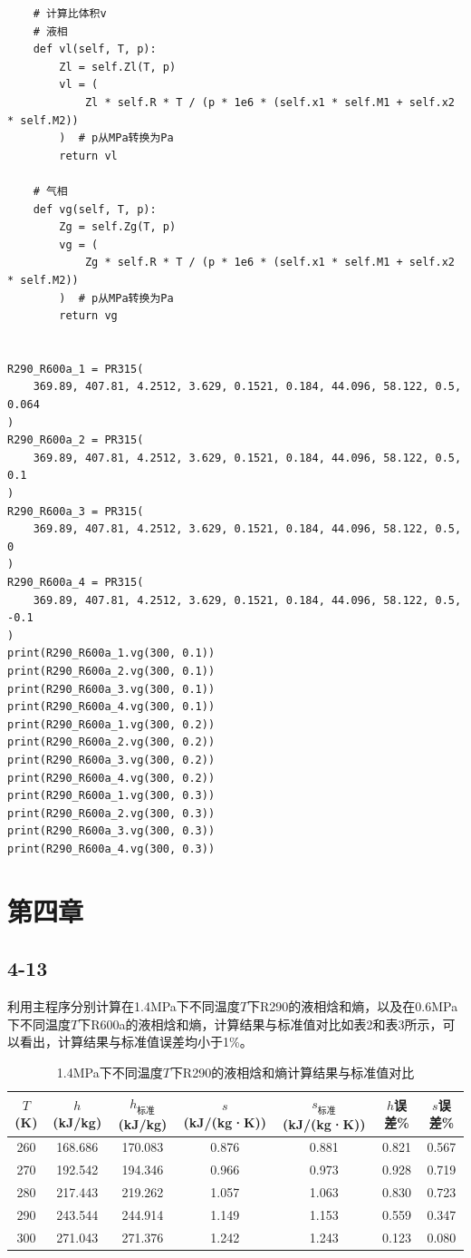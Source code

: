 \documentclass[12pt,a4paper]{article}
\begin{document}
\begin{lstlisting}
    # 计算比体积v
    # 液相
    def vl(self, T, p):
        Zl = self.Zl(T, p)
        vl = (
            Zl * self.R * T / (p * 1e6 * (self.x1 * self.M1 + self.x2 * self.M2))
        )  # p从MPa转换为Pa
        return vl

    # 气相
    def vg(self, T, p):
        Zg = self.Zg(T, p)
        vg = (
            Zg * self.R * T / (p * 1e6 * (self.x1 * self.M1 + self.x2 * self.M2))
        )  # p从MPa转换为Pa
        return vg


R290_R600a_1 = PR315(
    369.89, 407.81, 4.2512, 3.629, 0.1521, 0.184, 44.096, 58.122, 0.5, 0.064
)
R290_R600a_2 = PR315(
    369.89, 407.81, 4.2512, 3.629, 0.1521, 0.184, 44.096, 58.122, 0.5, 0.1
)
R290_R600a_3 = PR315(
    369.89, 407.81, 4.2512, 3.629, 0.1521, 0.184, 44.096, 58.122, 0.5, 0
)
R290_R600a_4 = PR315(
    369.89, 407.81, 4.2512, 3.629, 0.1521, 0.184, 44.096, 58.122, 0.5, -0.1
)
print(R290_R600a_1.vg(300, 0.1))
print(R290_R600a_2.vg(300, 0.1))
print(R290_R600a_3.vg(300, 0.1))
print(R290_R600a_4.vg(300, 0.1))
print(R290_R600a_1.vg(300, 0.2))
print(R290_R600a_2.vg(300, 0.2))
print(R290_R600a_3.vg(300, 0.2))
print(R290_R600a_4.vg(300, 0.2))
print(R290_R600a_1.vg(300, 0.3))
print(R290_R600a_2.vg(300, 0.3))
print(R290_R600a_3.vg(300, 0.3))
print(R290_R600a_4.vg(300, 0.3))
\end{lstlisting}

\newpage

\section*{第四章}

\subsection*{4-13}

利用主程序分别计算在1.4MPa下不同温度$T$下R290的液相焓和熵，以及在0.6MPa下不同温度$T$下R600a的液相焓和熵，计算结果与标准值对比如表2和表3所示，可以看出，计算结果与标准值误差均小于1\%。

\begin{table}[h]
\centering
\caption{1.4MPa下不同温度$T$下R290的液相焓和熵计算结果与标准值对比}
\begin{tabular}{c c c c c c c}
\hline
$T$ (K) & $h$ (kJ/kg) &$h_\text{标准}$(kJ/kg) & $s$ (kJ/(kg·K)) &$s_\text{标准}$(kJ/(kg·K))& $h$误差\%&$s$误差\%\\
\hline
260 & 168.686& 170.083& 0.876& 0.881& 0.821& 0.567\\
270 & 192.542& 194.346& 0.966& 0.973& 0.928& 0.719\\
280 & 217.443& 219.262& 1.057& 1.063& 0.830& 0.723\\
290 & 243.544& 244.914& 1.149& 1.153& 0.559& 0.347\\
300 & 271.043& 271.376& 1.242& 1.243& 0.123& 0.080\\
\hline
\end{tabular}
\end{table}
\end{document}
